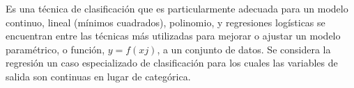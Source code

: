 
	Es una técnica de clasificación que es particularmente adecuada para un modelo continuo, lineal (mínimos cuadrados), polinomio, y regresiones logísticas se encuentran entre las técnicas más utilizadas para mejorar o ajustar un modelo paramétrico, o función, $y = f ( x j )$, a un conjunto de datos. Se considera la regresión un caso especializado de clasificación para los cuales las variables de salida son continuas en lugar de categórica.

